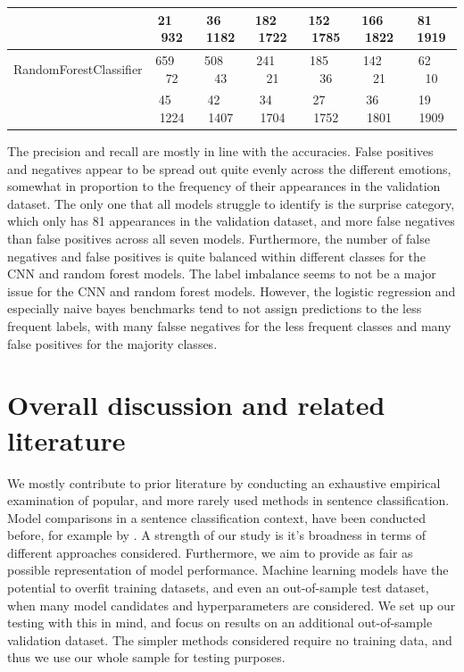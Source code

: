 \documentclass[conference]{IEEEtran}
\begin{document}
\begin{table}[htbp]
\begin{center}
\begin{tabular}{|c|c|c|c|c|c|c|}
 & 21$\;$$\;$$\;$$\;$932 & 36$\;$$\;$$\;$$\;$1182 & 182$\;$$\;$$\;$$\;$1722 & 152$\;$$\;$$\;$$\;$1785 & 166$\;$$\;$$\;$$\;$1822 & 81$\;$$\;$$\;$$\;$1919 \\ 
\hline
RandomForestClassifier & 659$\;$$\;$$\;$$\;$72 & 508$\;$$\;$$\;$$\;$43 & 241$\;$$\;$$\;$$\;$21 & 185$\;$$\;$$\;$$\;$36 & 142$\;$$\;$$\;$$\;$21 & 62$\;$$\;$$\;$$\;$10 \\ 

 & 45$\;$$\;$$\;$$\;$1224 & 42$\;$$\;$$\;$$\;$1407 & 34$\;$$\;$$\;$$\;$1704 & 27$\;$$\;$$\;$$\;$1752 & 36$\;$$\;$$\;$$\;$1801 & 19$\;$$\;$$\;$$\;$1909 \\ 
\hline
\end{tabular}
\label{taba2}
\end{center}
\end{table}

The precision and recall are mostly in line with the accuracies. False positives and negatives appear to be spread out quite evenly across the different emotions, somewhat in proportion to the frequency of their appearances in the validation dataset. The only one that all models struggle to identify is the surprise category, which only has 81 appearances in the validation dataset, and more false negatives than false positives across all seven models. Furthermore, the number of false negatives and false positives is quite balanced within different classes for the CNN and random forest models. The label imbalance seems to not be a major issue for the CNN and random forest models. However, the logistic regression and especially naive bayes benchmarks tend to not assign predictions to the less frequent labels, with many falsse negatives for the less frequent classes and many false positives for the majority classes.

\section{Overall discussion and related literature}

We mostly contribute to prior literature by conducting an exhaustive empirical examination of popular, and more rarely used methods in sentence classification. Model comparisons in a sentence classification context, have been conducted before, for example by \cite{colas}. A strength of our study is it's broadness in terms of different approaches considered. Furthermore, we aim to provide as fair as possible representation of model performance. Machine learning models have the potential to overfit training datasets, and even an out-of-sample test dataset, when many model candidates and hyperparameters are considered. We set up our testing with this in mind, and focus on results on an additional out-of-sample validation dataset. The simpler methods considered require no training data, and thus we use our whole sample for testing purposes.
\end{document}
